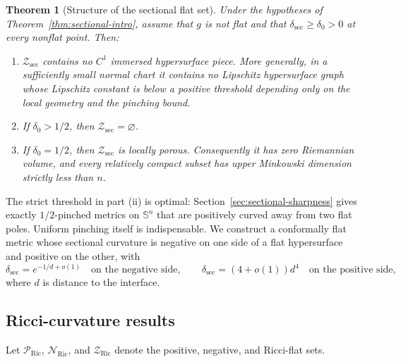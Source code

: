 \documentclass[11pt,reqno]{amsart}
\newtheorem{theorem}{Theorem}[section]
\theoremstyle{definition}
\theoremstyle{remark}
\newcommand{\Ric}{\operatorname{Ric}}
\newcommand{\Sph}{\mathbb S}
\newcommand{\cP}{\mathcal P}
\newcommand{\cN}{\mathcal N}
\newcommand{\cZ}{\mathcal Z}
\newcommand{\dsec}{\delta_{\mathrm{sec}}}
\begin{document}
\begin{theorem}[Structure of the sectional flat set]\label{thm:flat-intro}
Under the hypotheses of Theorem~\ref{thm:sectional-intro}, assume that $g$ is not flat and that $\dsec\ge\delta_0>0$ at every nonflat point.  Then:
\begin{enumerate}[label=(\roman*)]
\item $\cZ_{\mathrm{sec}}$ contains no $C^1$ immersed hypersurface piece.  More generally, in a sufficiently small normal chart it contains no Lipschitz hypersurface graph whose Lipschitz constant is below a positive threshold depending only on the local geometry and the pinching bound.
\item If $\delta_0>1/2$, then $\cZ_{\mathrm{sec}}=\varnothing$.
\item If $\delta_0=1/2$, then $\cZ_{\mathrm{sec}}$ is locally porous.  Consequently it has zero Riemannian volume, and every relatively compact subset has upper Minkowski dimension strictly less than $n$.
\end{enumerate}
\end{theorem}

The strict threshold in part (ii) is optimal: Section~\ref{sec:sectional-sharpness} gives exactly $1/2$-pinched metrics on $\Sph^n$ that are positively curved away from two flat poles.  Uniform pinching itself is indispensable.  We construct a conformally flat metric whose sectional curvature is negative on one side of a flat hypersurface and positive on the other, with
\[
\dsec=e^{-1/d+o(1)}
\quad\text{on the negative side},
\qquad
\dsec=(4+o(1))d^4
\quad\text{on the positive side},
\]
where $d$ is distance to the interface.

\subsection{Ricci-curvature results}

Let $\cP_{\Ric}$, $\cN_{\Ric}$, and $\cZ_{\Ric}$ denote the positive, negative, and Ricci-flat sets.
\end{document}
